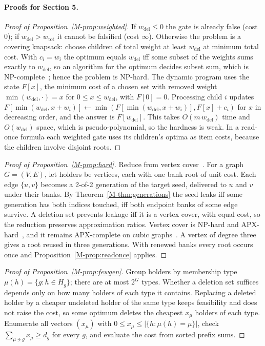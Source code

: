 \documentclass[pdflatex,sn-mathphys-num]{sn-jnl}
\theoremstyle{plain}
\begin{document}
\paragraph{Proofs for Section 5.}
\begin{proof}[Proof of Proposition~\ref{M-prop:weighted}]
If $w_{\mathrm{del}}\le0$ the gate is already false (cost $0$); if $w_{\mathrm{del}}>w_{\mathrm{tot}}$ it cannot be falsified (cost $\infty$). Otherwise the problem is a covering knapsack: choose children of total weight at least $w_{\mathrm{del}}$ at minimum total cost. With $c_i=w_i$ the optimum equals $w_{\mathrm{del}}$ iff some subset of the weights sums exactly to $w_{\mathrm{del}}$, so an algorithm for the optimum decides subset sum, which is NP-complete~\cite{karp1972}; hence the problem is NP-hard. The dynamic program uses the state $F[x]$, the minimum cost of a chosen set with removed weight $\min(w_{\mathrm{del}},\cdot)=x$ for $0\le x\le w_{\mathrm{del}}$, with $F[0]=0$. Processing child $i$ updates $F[\min(w_{\mathrm{del}},x+w_i)]\leftarrow\min(F[\min(w_{\mathrm{del}},x+w_i)],F[x]+c_i)$ for $x$ in decreasing order, and the answer is $F[w_{\mathrm{del}}]$. This takes $O(m\,w_{\mathrm{del}})$ time and $O(w_{\mathrm{del}})$ space, which is pseudo-polynomial, so the hardness is weak. In a read-once formula each weighted gate uses its children's optima as item costs, because the children involve disjoint roots.
\end{proof}
\begin{proof}[Proof of Proposition~\ref{M-prop:hard}]
Reduce from vertex cover~\cite{karp1972}. For a graph $G=(V,E)$, let holders be vertices, each with one bank root of unit cost. Each edge $\{u,v\}$ becomes a 2-of-2 generation of the target seed, delivered to $u$ and $v$ under their banks. By Theorem~\ref{M-thm:generations} the seed leaks iff some generation has both indices touched, iff both endpoint banks of some edge survive. A deletion set prevents leakage iff it is a vertex cover, with equal cost, so the reduction preserves approximation ratios. Vertex cover is NP-hard and APX-hard~\cite{karp1972,dinur2005}, and it remains APX-complete on cubic graphs~\cite{alimonti2000}. A vertex of degree three gives a root reused in three generations. With renewed banks every root occurs once and Proposition~\ref{M-prop:readonce} applies.
\end{proof}
\begin{proof}[Proof of Proposition~\ref{M-prop:fewgen}]
Group holders by membership type $\mu(h)=\{g:h\in H_g\}$; there are at most $2^G$ types. Whether a deletion set suffices depends only on how many holders of each type it contains. Replacing a deleted holder by a cheaper undeleted holder of the same type keeps feasibility and does not raise the cost, so some optimum deletes the cheapest $x_\mu$ holders of each type. Enumerate all vectors $(x_\mu)$ with $0\le x_\mu\le|\{h:\mu(h)=\mu\}|$, check $\sum_{\mu\ni g}x_\mu\ge d_g$ for every $g$, and evaluate the cost from sorted prefix sums.
\end{proof}
\end{document}
